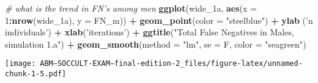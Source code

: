 \documentclass[]{article}
\newenvironment{Shaded}{\begin{snugshade}}{\end{snugshade}}
\newcommand{\KeywordTok}[1]{\textcolor[rgb]{0.13,0.29,0.53}{\textbf{#1}}}
\newcommand{\DataTypeTok}[1]{\textcolor[rgb]{0.13,0.29,0.53}{#1}}
\newcommand{\DecValTok}[1]{\textcolor[rgb]{0.00,0.00,0.81}{#1}}
\newcommand{\StringTok}[1]{\textcolor[rgb]{0.31,0.60,0.02}{#1}}
\newcommand{\CommentTok}[1]{\textcolor[rgb]{0.56,0.35,0.01}{\textit{#1}}}
\newcommand{\OperatorTok}[1]{\textcolor[rgb]{0.81,0.36,0.00}{\textbf{#1}}}
\newcommand{\NormalTok}[1]{#1}
\begin{document}
\begin{Shaded}
\begin{Highlighting}[]
\CommentTok{# what is the trend in FN's among men}
  \KeywordTok{ggplot}\NormalTok{(wide_1a, }\KeywordTok{aes}\NormalTok{(}\DataTypeTok{x =} \DecValTok{1}\OperatorTok{:}\KeywordTok{nrow}\NormalTok{(wide_1a), }\DataTypeTok{y =}\NormalTok{ FN_m)) }\OperatorTok{+}\StringTok{ }
\StringTok{    }\KeywordTok{geom_point}\NormalTok{(}\DataTypeTok{color =} \StringTok{"steelblue"}\NormalTok{) }\OperatorTok{+}
\StringTok{    }\KeywordTok{ylab}\NormalTok{ (}\StringTok{'n individuals'}\NormalTok{) }\OperatorTok{+}\StringTok{ }\KeywordTok{xlab}\NormalTok{(}\StringTok{'iterations'}\NormalTok{) }\OperatorTok{+}
\StringTok{    }\KeywordTok{ggtitle}\NormalTok{(}\StringTok{"Total False Negatives in Males, simulation 1.a"}\NormalTok{) }\OperatorTok{+}
\StringTok{    }\KeywordTok{geom_smooth}\NormalTok{(}\DataTypeTok{method =} \StringTok{"lm"}\NormalTok{, }\DataTypeTok{se =}\NormalTok{ F, }\DataTypeTok{color =} \StringTok{"seagreen"}\NormalTok{)}
\end{Highlighting}
\end{Shaded}

\texttt{[image: ABM---SOCCULT-EXAM---final-edition-2\_files/figure-latex/unnamed-chunk-1-5.pdf]}
\end{document}
